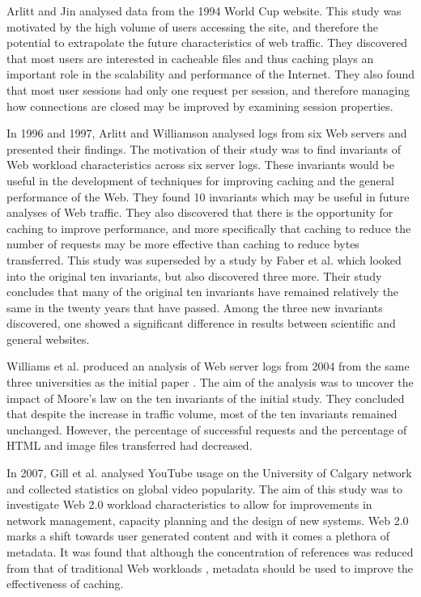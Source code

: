 \documentclass[10pt,conference]{IEEEtran}
\begin{document}
Arlitt and Jin \cite{world_cup} analysed data from the 1994 World Cup website. This study was motivated by the high volume of users accessing the site, and therefore the potential to extrapolate the future characteristics of web traffic. They discovered that most users are interested in cacheable files and thus caching plays an important role in the scalability and performance of the Internet. They also found that most user sessions had only one request per session, and therefore managing how connections are closed may be improved by examining session properties.

In 1996 and 1997, Arlitt and Williamson \cite{keynote, invariants} analysed logs from six Web servers and presented their findings. The motivation of their study was to find invariants of Web workload characteristics across six server logs. These invariants would be useful in the development of techniques for improving caching and the general performance of the Web. They found 10 invariants which may be useful in future analyses of Web traffic. They also discovered that there is the opportunity for caching to improve performance, and more specifically that caching to reduce the number of requests may be more effective than caching to reduce bytes transferred. 
This study was superseded by a study by Faber et al. \cite{Faber} which looked into the original ten invariants, but also discovered three more. Their study concludes that many of the original ten invariants have remained relatively the same in the twenty years that have passed. Among the three new invariants discovered, one showed a significant difference in results between scientific and general websites.

Williams et al. \cite{williams05} produced an analysis of Web server logs from 2004 from the same three universities as the initial paper \cite{keynote}. The aim of the analysis was to uncover the impact of Moore's law on the ten invariants of the initial study. They concluded that despite the increase in traffic volume, most of the ten invariants remained unchanged. However, the percentage of successful requests and the percentage of HTML and image files transferred had decreased. 

In 2007, Gill et al. \cite{youtube} analysed YouTube usage on the University of Calgary network and collected statistics on global video popularity. The aim of this study was to investigate Web 2.0 workload characteristics to allow for improvements in network management, capacity planning and the design of new systems. Web 2.0 marks a shift towards user generated content and with it comes a plethora of metadata. It was found that although the concentration of references was reduced from that of traditional Web workloads \cite{keynote}, metadata should be used to improve the effectiveness of caching.
\end{document}
